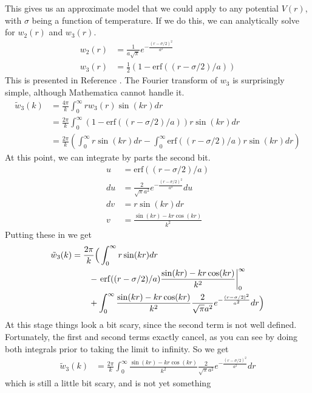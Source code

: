 \documentclass[letterpaper,twocolumn,amsmath,amssymb,prb]{revtex4-1}
\begin{document}
This gives us an approximate model that we could apply to any
potential $V(r)$, with $\sigma$ being a function of temperature.  If
we do this, we can analytically solve for $w_2(r)$ and $w_3(r)$.
\begin{align}
  w_2(r) &= \frac{1}{a\sqrt{\pi}} e^{-\frac{(r-\sigma/2)^2}{a^2}} \\
  w_3(r) &= \tfrac12 ( 1 - \mathrm{erf}((r-\sigma/2)/a) )
\end{align}
This is presented in Reference .  The
Fourier transform of $w_3$ is surprisingly simple, although
Mathematica cannot handle it.
\begin{align}
  \tilde{w}_3(k) &= \frac{4\pi}{k} \int_0^\infty r w_3(r) \sin(kr) dr
  \\
  &=  \frac{2\pi}{k} \int_0^\infty ( 1 -
  \mathrm{erf}((r-\sigma/2)/a) ) r \sin(kr) dr
  \\
  &=  \frac{2\pi}{k} \left(
  \int_0^\infty r \sin(kr) dr
  -
  \int_0^\infty \mathrm{erf}((r-\sigma/2)/a) r \sin(kr) dr
  \right)
\end{align}
At this point, we can integrate by parts the second bit.
\begin{align}
  u &= \mathrm{erf}((r-\sigma/2)/a) \\
  du &= \frac{2}{\sqrt{\pi}a^2} e^{-\frac{(r-\sigma/2)^2}{a^2}} du \\
  dv &= r \sin(kr) dr \\
  v &= \frac{\sin(kr) - kr \cos(kr)}{k^2}
\end{align}
Putting these in we get
\begin{align} 
 \tilde{w}_3(k)
  &=  \frac{2\pi}{k} \Big( \int_0^\infty r \sin(kr) dr \notag \\ 
 &\quad\quad - \left.\mathrm{erf}((r-\sigma/2)/a)\frac{\sin(kr) - kr
    \cos(kr)}{k^2}\right|_0^\infty \notag \\ &\quad\quad
  +
  \int_0^\infty \frac{\sin(kr) - kr \cos(kr)}{k^2}\frac{2}{\sqrt{\pi}a^2} e^{-\frac{(r-\sigma/2)^2}{a^2}} dr
  \Big)
\end{align}
At this stage things look a bit scary, since the second term is not
well defined.  Fortunately, the first and second terms exactly cancel,
as you can see by doing both integrals prior to taking the limit to
infinity.  So we get
\begin{align}
  \tilde{w}_3(k)
  &=  \frac{2\pi}{k}\int_0^\infty \frac{\sin(kr) - kr
    \cos(kr)}{k^2}\frac{2}{\sqrt{\pi}a^2}
  e^{-\frac{(r-\sigma/2)^2}{a^2}} dr
\end{align}
which is still a little bit scary, and is not yet something
\end{document}

